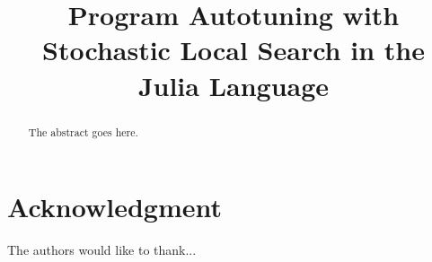\documentclass[conference,a4paper]{IEEEtran}
\begin{document}
\title{Program Autotuning with Stochastic Local Search in the Julia Language}

\author{
}

\maketitle

\begin{abstract}
The abstract goes here.
\end{abstract}

\IEEEpeerreviewmaketitle



\section*{Acknowledgment}

The authors would like to thank...




\end{document}
